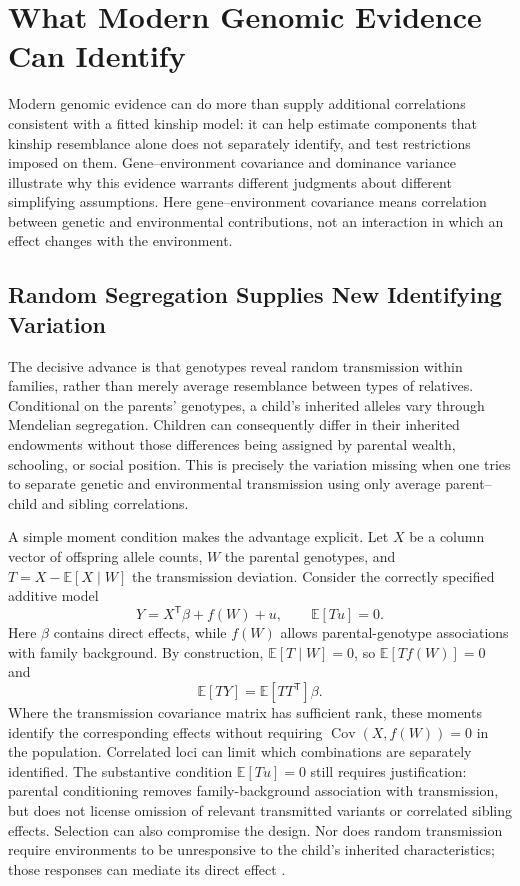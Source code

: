 \section{What Modern Genomic Evidence Can Identify}
\label{sec:genomic-evidence}

Modern genomic evidence can do more than supply additional correlations
consistent with a fitted kinship model: it can help estimate components
that kinship resemblance alone does not separately identify, and test
restrictions imposed on them. Gene--environment covariance and dominance
variance illustrate why this evidence warrants different judgments about
different simplifying assumptions. Here gene--environment covariance
means correlation between genetic and environmental contributions, not
an interaction in which an effect changes with the environment.

\subsection{Random Segregation Supplies New Identifying Variation}

The decisive advance is that genotypes reveal random transmission within
families, rather than merely average resemblance between types of relatives.
Conditional on the parents' genotypes, a child's inherited alleles vary
through Mendelian segregation. Children can consequently differ in their
inherited endowments without those differences being assigned by parental
wealth, schooling, or social position. This is precisely the variation
missing when one tries to separate genetic and environmental transmission
using only average parent--child and sibling correlations.

A simple moment condition makes the advantage explicit. Let $X$ be a column
vector of offspring allele counts, $W$ the parental genotypes, and
$T=X-\mathbb E[X\mid W]$ the transmission deviation. Consider the correctly
specified additive model
\[
 Y=X^{\mathsf T}\beta+f(W)+u,\qquad \mathbb E[T u]=0.
\]
Here $\beta$ contains direct effects, while $f(W)$ allows parental-genotype
associations with family background. By construction,
$\mathbb E[T\mid W]=0$, so $\mathbb E[T f(W)]=0$ and
\[
 \mathbb E[T Y]=\mathbb E[T T^{\mathsf T}]\beta.
\]
Where the transmission covariance matrix has sufficient rank, these
moments identify the corresponding effects without requiring
$\operatorname{Cov}(X,f(W))=0$ in the population. Correlated loci can limit
which combinations are separately identified. The substantive condition
$\mathbb E[T u]=0$ still requires justification: parental conditioning
removes family-background association with transmission, but does not
license omission of relevant transmitted variants or correlated sibling
effects. Selection can also compromise the design. Nor does random
transmission require environments to be unresponsive to the child's
inherited characteristics; those responses can mediate its direct effect
\citep[Sections~3.1, 4.4--4.5]{BenjaminEtAl2026}.

